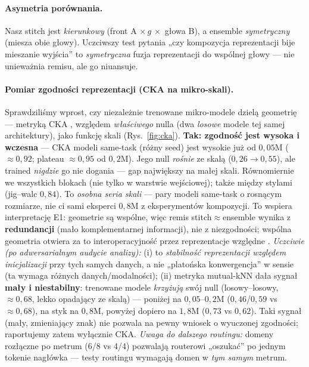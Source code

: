 \documentclass[11pt]{article}
\begin{document}
\paragraph{Asymetria porównania.} Nasz stitch jest \emph{kierunkowy} (front A $\times\,g\,\times$ głowa B), a ensemble \emph{symetryczny} (miesza obie głowy). Uczciwszy test pytania „czy kompozycja reprezentacji bije mieszanie wyjścia'' to \emph{symetryczna} fuzja reprezentacji do wspólnej głowy --- nie unieważnia remisu, ale go niuansuje.

\paragraph{Pomiar zgodności reprezentacji (CKA na mikro-skali).} Sprawdziliśmy wprost, czy niezależnie trenowane mikro-modele dzielą geometrię --- metryką CKA \cite{cka}, względem \emph{właściwego} nulla (dwa \emph{losowe} modele tej samej architektury), jako funkcję skali (Rys.~\ref{fig:cka}). \textbf{Tak: zgodność jest wysoka i wczesna} --- CKA modeli same-task (różny seed) jest wysokie już od $0{,}05$M ($\approx0{,}92$; plateau $\approx0{,}95$ od $0{,}2$M). Jego null \emph{rośnie} ze skalą ($0{,}26\!\to\!0{,}55$), ale trained \emph{nigdzie} go nie dogania --- gap największy na małej skali. Równomiernie we wszystkich blokach (nie tylko w warstwie wejściowej); także między stylami (jig--walc $0{,}84$). To \emph{osobna seria skali} --- pary modeli same-task o rosnącym rozmiarze, nie ci sami eksperci $0{,}8$M z eksperymentów kompozycji. To wspiera interpretację E1: geometrie są wspólne, więc remis stitch$\approx$ensemble wynika z \textbf{redundancji} (mało komplementarnej informacji), nie z niezgodności; wspólna geometria otwiera za to interoperacyjność przez reprezentacje względne \cite{relreps}. \emph{Uczciwie (po adwersarialnym audycie analizy):} (i) to \emph{stabilność reprezentacji względem inicjalizacji} przy tych samych danych, a nie „platońska konwergencja'' w sensie \cite{platonic} (ta wymaga różnych danych/modalności); (ii) metryka mutual-kNN dała sygnał \textbf{mały i niestabilny}: trenowane modele \emph{krzyżują} swój null (losowy--losowy, $\approx0{,}68$, lekko opadający ze skalą) --- poniżej na $0{,}05$--$0{,}2$M ($0{,}46$/$0{,}59$ vs $\approx0{,}68$), na styk na $0{,}8$M, powyżej dopiero na $1{,}8$M ($0{,}73$ vs $0{,}62$). Taki sygnał (mały, zmieniający znak) nie pozwala na pewny wniosek o wyuczonej zgodności; raportujemy zatem wyłącznie CKA. \emph{Uwaga do dalszego routingu:} domeny rozłączne po metrum (6/8 vs 4/4) pozwalają routerowi „oszukać'' po jednym tokenie nagłówka --- testy routingu wymagają domen w \emph{tym samym} metrum.
\end{document}
